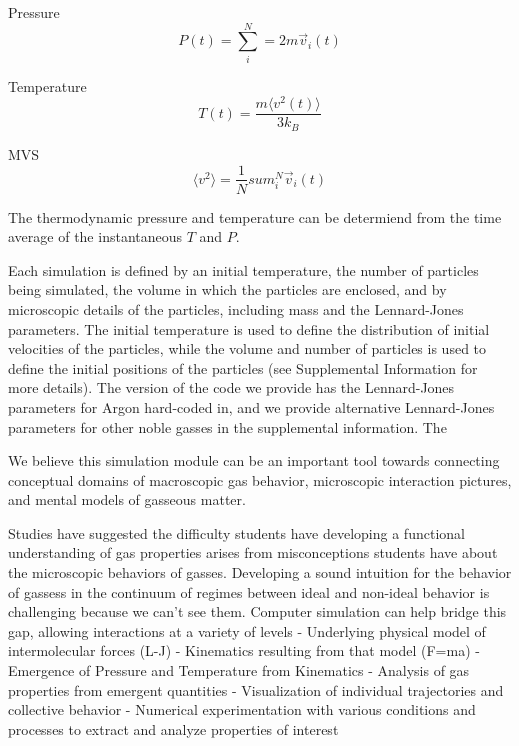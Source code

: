 \documentclass[journal=jpclcd,manuscript=article]{achemso}
\begin{document}
Pressure
\begin{equation}
P(t) = \sum_i^N = 2 m \vec{v}_i(t)
\end{equation}

Temperature
\begin{equation}
T(t) = \frac{ m \langle v^2 (t) \rangle }{3 k_B}
\end{equation}

MVS
\begin{equation}
\langle v^2 \rangle = \frac{1}{N} sum_i^N \vec{v}_i(t)
\end{equation}

The thermodynamic pressure and temperature can be determiend from the time average of
the instantaneous $T$ and $P$.  

Each simulation is defined
by an initial temperature, the number of particles being simulated, the volume in which the particles are enclosed,
and by microscopic details of the particles, including mass and the Lennard-Jones parameters.  The initial temperature
is used to define the distribution of initial velocities of the particles, while the volume and number of particles is used
to define the initial positions of the particles (see Supplemental Information for more details).  The version of the code
we provide has the Lennard-Jones parameters for Argon%
hard-coded in, and we provide alternative Lennard-Jones parameters for other noble gasses in the supplemental information.
The

We believe this simulation module can be an important tool towards connecting conceptual domains of macroscopic gas behavior,
microscopic interaction pictures, and mental models of gasseous matter.

Studies have suggested the difficulty students have developing a functional understanding of gas properties
arises from misconceptions students have about the microscopic behaviors of gasses.
Developing a sound intuition for the behavior of gassess in the continuum of regimes between ideal and non-ideal
behavior is challenging because we can't see them.
Computer simulation can help bridge this gap, allowing interactions at a variety of levels
- Underlying physical model of intermolecular forces (L-J)
- Kinematics resulting from that model (F=ma)
- Emergence of Pressure and Temperature from Kinematics
- Analysis of gas properties from emergent quantities
- Visualization of individual trajectories and collective behavior
- Numerical experimentation with various conditions and processes to extract and analyze properties of interest
\end{document}
